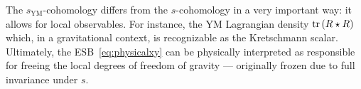 \documentclass[../main.tex]{subfiles}
\begin{document}
The $ s_{\text{YM}} $-cohomology differs from the $ s $-cohomology in a very important way: it allows for local observables. For instance, the YM Lagrangian density $ \operatorname{tr} \left( R \star R \right) $ which, in a gravitational context, is recognizable as the Kretschmann scalar. Ultimately, the ESB~\eqref{eq:physicalxy} can be physically interpreted as responsible for freeing the local degrees of freedom of gravity --- originally frozen due to full invariance under $s$.
\end{document}
